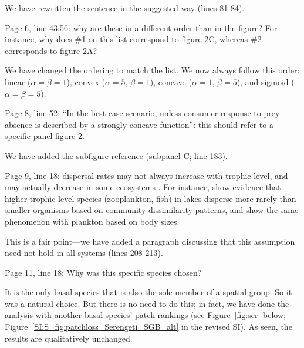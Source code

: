 \documentclass[11pt]{article}
\newcommand{\SI}{SI}
\newcommand{\us}{\rm \setlength{\leftskip}{0.3cm} \setlength{\rightskip}{0.3cm}}
\newcommand{\them}{\it \setlength{\leftskip}{0cm} \setlength{\rightskip}{0cm}}
\begin{document}
We have rewritten the sentence in the suggested way (lines 81-84).

\them

Page 6, line 43:56: why are these in a different order than in the figure? For instance, why does \#1 on this list correspond to figure 2C, whereas \#2 corresponds to figure 2A?

\us

We have changed the ordering to match the list. We now always follow this order: linear ($\alpha = \beta = 1$), convex ($\alpha = 5$, $\beta = 1$), concave ($\alpha = 1$, $\beta = 5$), and sigmoid ($\alpha = \beta = 5$).

\them

Page 8, line 52: ``In the best-case scenario, unless consumer response to prey absence is described by a strongly concave function'': this should refer to a specific panel figure 2.

\us

We have added the subfigure reference (subpanel C; line 183).

\them

Page 9, line 18: dispersal rates may not always increase with trophic level, and may actually decrease in some ecosystems \citep{Pedersenetal2016}. For instance, \citet{Beisneretal2006} show evidence that higher trophic level species (zooplankton, fish) in lakes disperse more rarely than smaller organisms based on community dissimilarity patterns, and \citet{Villarinoetal2018} show the same phenomenon with plankton based on body sizes.

\us

This is a fair point---we have added a paragraph discussing that this assumption need not hold in all systems (lines 208-213).

\them

Page 11, line 18: Why was this specific species chosen?

\us

It is the only basal species that is also the sole member of a spatial group. So it was a natural choice. But there is no need to do this; in fact, we have done the analysis with another basal species' patch rankings (see Figure~\ref{fig:ser} below; Figure~\ref{SI:S_fig:patchloss_Serengeti_SGB_alt} in the revised \SI). As seen, the results are qualitatively unchanged.
\end{document}
